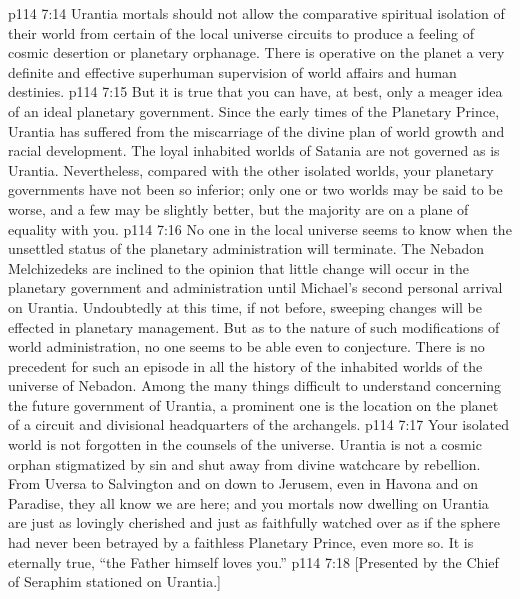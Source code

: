 \pc \vs p114 7:14 Urantia mortals should not allow the comparative spiritual isolation of their world from certain of the local universe circuits to produce a feeling of cosmic desertion or planetary orphanage. There is operative on the planet a very definite and effective superhuman supervision of world affairs and human destinies.
\vs p114 7:15 But it is true that you can have, at best, only a meager idea of an ideal planetary government. Since the early times of the Planetary Prince, Urantia has suffered from the miscarriage of the divine plan of world growth and racial development. The loyal inhabited worlds of Satania are not governed as is Urantia. Nevertheless, compared with the other isolated worlds, your planetary governments have not been so inferior; only one or two worlds may be said to be worse, and a few may be slightly better, but the majority are on a plane of equality with you.
\vs p114 7:16 No one in the local universe seems to know when the unsettled status of the planetary administration will terminate. The Nebadon Melchizedeks are inclined to the opinion that little change will occur in the planetary government and administration until Michael’s second personal arrival on Urantia. Undoubtedly at this time, if not before, sweeping changes will be effected in planetary management. But as to the nature of such modifications of world administration, no one seems to be able even to conjecture. There is no precedent for such an episode in all the history of the inhabited worlds of the universe of Nebadon. Among the many things difficult to understand concerning the future government of Urantia, a prominent one is the location on the planet of a circuit and divisional headquarters of the archangels.
\vs p114 7:17 Your isolated world is not forgotten in the counsels of the universe. Urantia is not a cosmic orphan stigmatized by sin and shut away from divine watchcare by rebellion. From Uversa to Salvington and on down to Jerusem, even in Havona and on Paradise, they all know we are here; and you mortals now dwelling on Urantia are just as lovingly cherished and just as faithfully watched over as if the sphere had never been betrayed by a faithless Planetary Prince, even more so. It is eternally true, “the Father himself loves you.”
\vsetoff
\vs p114 7:18 [Presented by the Chief of Seraphim stationed on Urantia.]
